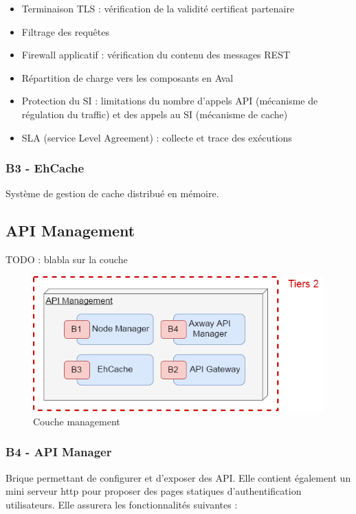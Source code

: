 	\begin{itemize}
		\item Terminaison TLS : vérification de la validité certificat partenaire
		\item Filtrage des requêtes 
		\item Firewall applicatif : vérification du contenu des messages REST
		\item Répartition de charge vers les composants en Aval
		\item Protection du SI : limitations du nombre d’appels API (mécanisme de régulation du traffic) et des appels au SI (mécanisme de cache)
		\item SLA (service Level Agreement) : collecte et trace des exécutions \\
	\end{itemize}
	
	\subsubsection{B3 - EhCache}
	Système de gestion de cache distribué en mémoire.
	
	\subsection{API Management}
	
	TODO : blabla sur la couche
	
\begin{figure}[H]
	\includegraphics[scale=0.5]{images/travailNeuflizeOBC/architecture/coucheManagement.png}
	\centering
	\caption{Couche management}
	\label{coucheManagement}
\end{figure}

	\subsubsection{B4 - API Manager}
	Brique permettant de configurer et d’exposer des API. Elle contient également un mini serveur http pour proposer des pages statiques d’authentification utilisateurs. Elle assurera les fonctionnalités suivantes : \\
	
